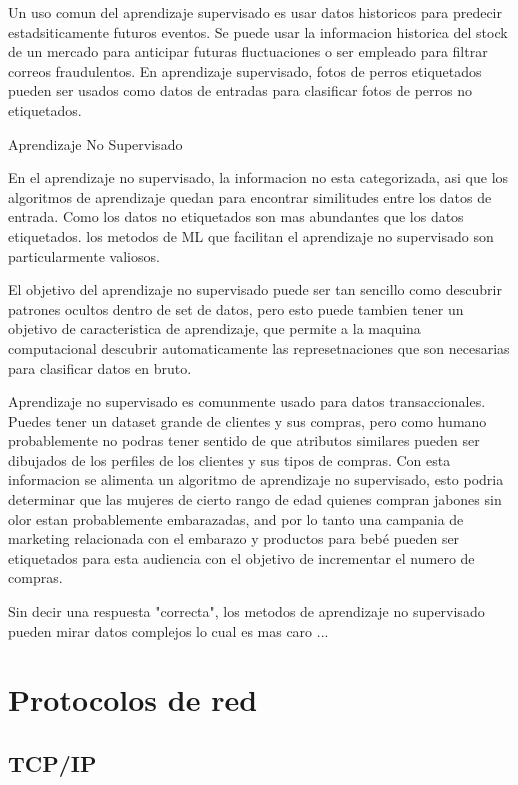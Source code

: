 Un uso comun del aprendizaje supervisado es usar datos historicos para predecir estadsiticamente futuros eventos. Se puede usar la informacion historica del stock de un mercado para anticipar futuras fluctuaciones o ser empleado para filtrar correos fraudulentos. En aprendizaje supervisado, fotos de perros etiquetados pueden ser usados como datos de entradas para clasificar fotos de perros no etiquetados.

Aprendizaje No Supervisado

En el aprendizaje no supervisado, la informacion no esta categorizada, asi que los algoritmos de aprendizaje quedan para encontrar similitudes entre los datos de entrada. Como los datos no etiquetados son mas abundantes que los datos etiquetados. los metodos de ML que facilitan el aprendizaje no supervisado son particularmente valiosos.

El objetivo del aprendizaje no supervisado puede ser tan sencillo como descubrir patrones ocultos dentro de set de datos, pero esto puede tambien tener un objetivo de caracteristica de aprendizaje, que permite a la maquina computacional descubrir automaticamente las represetnaciones que son necesarias para clasificar datos en bruto.

Aprendizaje no supervisado es comunmente usado para datos transaccionales. Puedes tener un dataset grande de clientes y sus compras, pero como humano probablemente no podras tener sentido de que atributos similares pueden ser dibujados de los perfiles de los clientes y sus tipos de compras. Con esta informacion se alimenta un algoritmo de aprendizaje no supervisado, esto podria determinar que las mujeres de cierto rango de edad quienes compran jabones sin olor estan probablemente embarazadas, and por lo tanto una campania de marketing relacionada con el embarazo y productos para bebé pueden ser etiquetados para esta audiencia con el objetivo de incrementar el numero de compras.

Sin decir una respuesta "correcta", los metodos de aprendizaje no supervisado pueden mirar datos complejos lo cual es mas caro ...


\section{Protocolos de red}

\subsection{TCP/IP}

